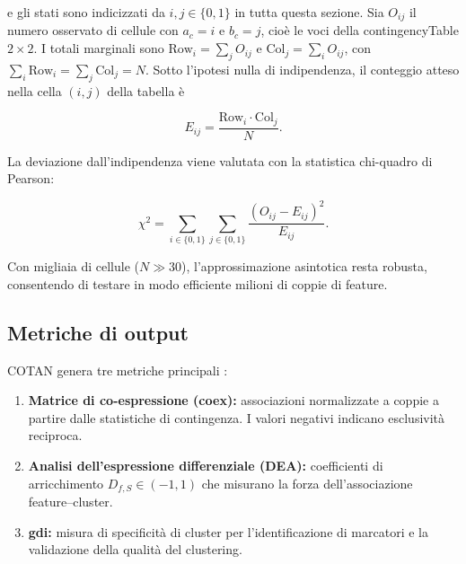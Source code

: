 e gli stati sono indicizzati da $i, j \in \{0,1\}$ in tutta questa sezione. Sia $O_{ij}$ il numero osservato di cellule con $a_c = i$ e $b_c = j$, cioè le voci della \gls{contingencyTable} $2 \times 2$. I totali marginali sono $\mathrm{Row}_i = \sum_j O_{ij}$ e $\mathrm{Col}_j = \sum_i O_{ij}$, con $\sum_i \mathrm{Row}_i = \sum_j \mathrm{Col}_j = N$. Sotto l'ipotesi nulla di indipendenza, il conteggio atteso nella cella $(i,j)$ della tabella è

$$E_{ij} = \frac{\mathrm{Row}_i \cdot \mathrm{Col}_j}{N}.$$

La deviazione dall'indipendenza viene valutata con la statistica chi-quadro di Pearson\cite{galfre2021cotan}:

$$\chi^2 = \sum_{i \in \{0,1\}} \sum_{j \in \{0,1\}} \frac{(O_{ij} - E_{ij})^2}{E_{ij}}.$$

Con migliaia di cellule ($N \gg 30$), l'approssimazione asintotica resta robusta\cite{galfre2021cotan}, consentendo di testare in modo efficiente milioni di coppie di feature.

\subsection{Metriche di output}
COTAN genera tre metriche principali \cite{galfre2021cotan}:
\begin{enumerate}
    \item \textbf{Matrice di co-espressione (coex):} associazioni normalizzate a coppie a partire dalle statistiche di contingenza. I valori negativi indicano esclusività reciproca.
    
    \item \textbf{Analisi dell'espressione differenziale (DEA):} coefficienti di arricchimento $D_{f,S} \in (-1, 1)$ che misurano la forza dell'associazione feature--cluster.
    
    \item \textbf{\gls{gdi}:} misura di specificità di cluster per l'identificazione di marcatori e la validazione della qualità del clustering.
\end{enumerate}

